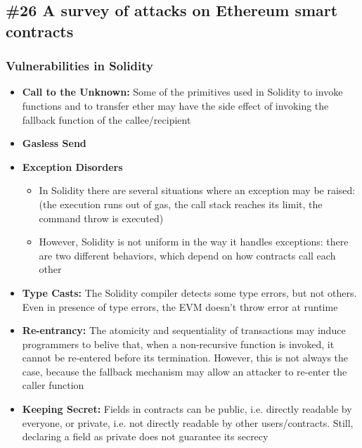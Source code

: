 \subsection*{\#26 A survey of attacks on Ethereum smart contracts}
\subsubsection{Vulnerabilities in Solidity}
\begin{itemize}
	\item \textbf{Call to the Unknown:} Some of the primitives used in Solidity to invoke functions and to transfer ether may have the side effect of invoking the fallback function of the callee/recipient
	\item\textbf{Gasless Send}
	\item\textbf{Exception Disorders}
	\begin{itemize}
		\item In Solidity there are several situations where an exception may be raised: (the execution runs out of gas, the call stack reaches its limit, the command throw is executed)
		\item However, Solidity is not uniform in the way it handles exceptions: there are two different behaviors, which depend on how contracts call each other
	\end{itemize}
	\item\textbf{Type Casts:} The Solidity compiler detects some type errors, but not others. Even in presence of type errors, the EVM doesn't throw error at runtime
	\item\textbf{Re-entrancy:} The atomicity and sequentiality of transactions may induce programmers to belive that, when a non-recursive function is invoked, it cannot be re-entered before its termination. However, this is not always the case, because the fallback mechanism may allow an attacker to re-enter the caller function
	\item\textbf{Keeping Secret:} Fields in contracts can be public, i.e. directly readable by everyone, or private, i.e. not directly readable by other users/contracts. Still, declaring a field as private does not guarantee its secrecy
\end{itemize}
